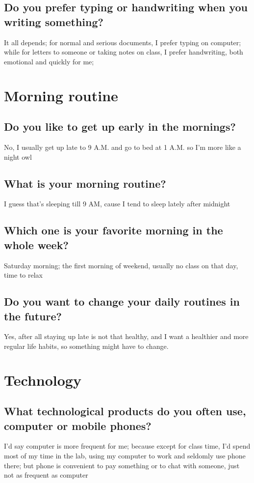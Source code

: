 \documentclass[conference]{IEEEtran}
\begin{document}
\subsection{Do you prefer typing or handwriting when you writing something?}
It all depends; for normal and serious documents, I prefer typing on computer;
while for letters to someone or taking notes on class, I prefer handwriting, both
emotional and quickly for me;

\section{Morning routine}
\subsection{Do you like to get up early in the mornings?}
No, I usually get up late to 9 A.M. and go to bed at 1 A.M.
so I'm more like a night owl
\subsection{What is your morning routine?}
I guess that's sleeping till 9 AM, cause I tend to sleep lately after midnight
\subsection{Which one is your favorite morning in the whole week?}
Saturday morning; the first morning of weekend, usually no class on that day,
time to relax
\subsection{Do you want to change your daily routines in the future?}
Yes, after all staying up late is not that healthy, and I want a healthier and more
regular life habits, so something might have to change.

\section{Technology}
\subsection{What technological products do you often use, 
computer or mobile phones?}
I'd say computer is more frequent for me;
because except for class time, I'd spend most of my time in the lab, using my
computer to work and seldomly use phone there; but phone is convenient to pay something
or to chat with someone, just not as frequent as computer
\end{document}
